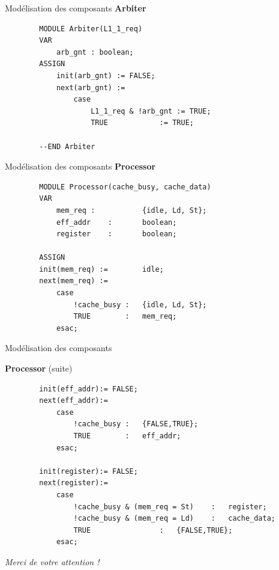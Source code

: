 \documentclass{beamer}
\begin{document}
\begin{frame}[fragile]{Modélisation des composants}
    \textbf{Arbiter}
    \begin{lstlisting}
        MODULE Arbiter(L1_1_req)
        VAR
            arb_gnt : boolean;
        ASSIGN
            init(arb_gnt) := FALSE;
            next(arb_gnt) := 
                case
                    L1_1_req & !arb_gnt	:= TRUE;
                    TRUE			:= TRUE;
            
        --END Arbiter
    \end{lstlisting}
\end{frame}

\begin{frame}[fragile]{Modélisation des composants}
    \textbf{Processor}
    \begin{lstlisting}
        MODULE Processor(cache_busy, cache_data)
        VAR
            mem_req	:	        {idle, Ld, St};
            eff_addr	:	    boolean;
            register	:	    boolean;

        ASSIGN
        init(mem_req) :=        idle;
        next(mem_req) := 
            case
                !cache_busy	:	{idle, Ld, St};
                TRUE		:	mem_req;
            esac;
    \end{lstlisting}
\end{frame}

\begin{frame}[fragile]{Modélisation des composants}
    \addtocounter{framenumber}{-1}
    \textbf{Processor} (suite)
    \begin{lstlisting}
        init(eff_addr):= FALSE; 
        next(eff_addr):=
            case
                !cache_busy	:	{FALSE,TRUE};
                TRUE		:	eff_addr;
            esac;

        init(register):= FALSE; 
        next(register):=
            case
                !cache_busy & (mem_req = St)	:	register;
                !cache_busy & (mem_req = Ld)	:	cache_data;
                TRUE				:	{FALSE,TRUE};
            esac;
    \end{lstlisting}
\end{frame}

\begin{frame}
    \centering \Large
    \emph{Merci de votre attention !}  

    \href{https://github.com/kimmeng1/Projet-Modelisation-et-Verification-de-systemes-concurrents}{}
    
\end{frame}
\end{document}
